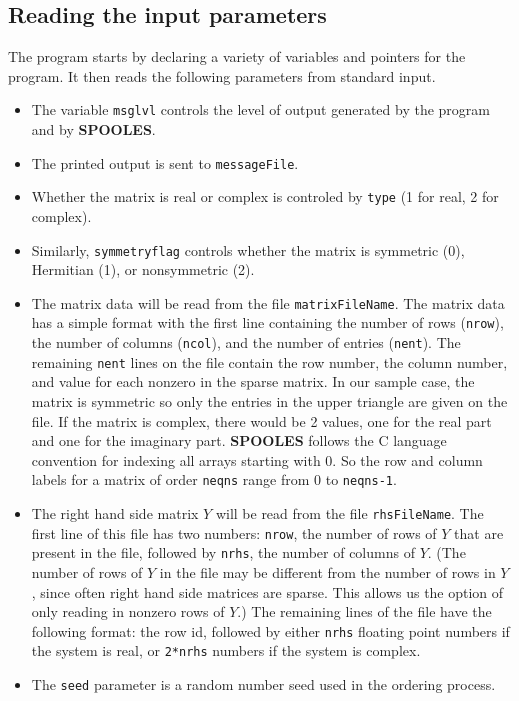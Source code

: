 \subsection{Reading the input parameters}
\label{subsection:serial:input-data}
\par
The program starts by declaring a variety of variables
and pointers for the program.  It then reads 
the following parameters from standard input.
\begin{itemize}
\item
The variable {\tt msglvl} controls the
level of output generated by the program and by {\bf SPOOLES}.
\item
The printed output is sent to {\tt messageFile}.
\item
Whether the matrix is real or complex is controled by {\tt type} 
(1 for real, 2 for complex).
\item
Similarly, {\tt symmetryflag} controls whether the matrix is
symmetric (0), Hermitian (1), or nonsymmetric (2).
\item
The matrix data will be read from the file {\tt matrixFileName}.
The matrix data has a simple format with the first line
containing the number of rows ({\tt nrow}), the number of
columns ({\tt ncol}), and the number of entries ({\tt nent}).
The remaining {\tt nent} lines on the file contain the row
number, the column number, and value for each nonzero in the sparse
matrix.
In our sample case, the matrix is symmetric so only the entries
in the upper triangle are given on the file.
If the matrix is complex, there would be 2 values,
one for the real part and one for the imaginary part.  
{\bf SPOOLES} follows the C language convention for indexing 
all arrays starting with 0.  
So the row and column labels for a matrix of order {\tt neqns} range 
from 0 to {\tt neqns-1}.
\item
The right hand side matrix $Y$ 
will be read from the file {\tt rhsFileName}.
The first line of this file has two numbers: 
{\tt nrow}, the number of rows of $Y$ 
that are present in the file, 
followed by {\tt nrhs}, the number of columns of $Y$.
(The number of rows of $Y$ in the file may be different from the
number of rows in $Y$, since often right hand side matrices are
sparse.
This allows us the option of only reading in nonzero rows of $Y$.)
The remaining lines of the file have the following format:
the row id, followed by either {\tt nrhs} floating point numbers if
the system is real, or {\tt 2*nrhs} numbers if the system is complex.
\item
The {\tt seed} parameter is a random number seed used in the
ordering process.
\end{itemize}
\par
